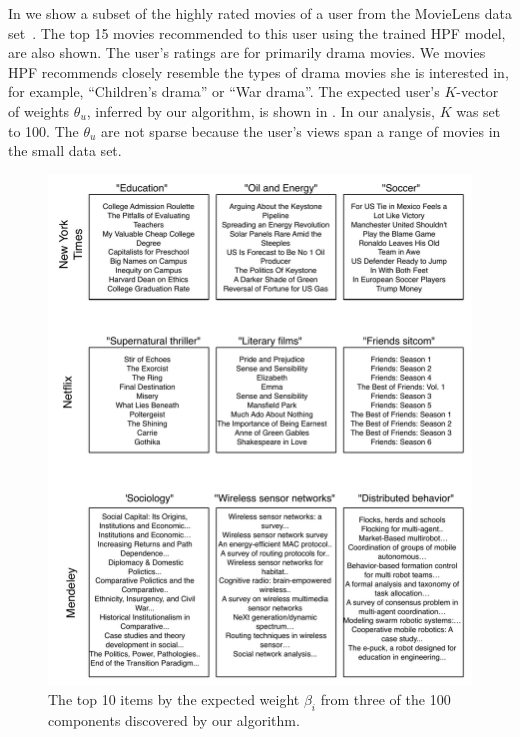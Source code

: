 In  we show a subset of the highly rated
movies of a user from the MovieLens data
set~\cite{Herlocker:1999}. The top 15 movies recommended to this user
using the trained HPF model, are also shown. The user's ratings are
for primarily drama movies. We movies HPF recommends closely resemble
the types of drama movies she is interested in, for example,
``Children's drama'' or ``War drama''. The expected user's $K$-vector
of weights $\theta_u$, inferred by our algorithm, is shown in
. In our analysis, $K$ was set to
100. The $\theta_u$ are not sparse because the user's views span a
range of movies in the small data set.

\begin{figure}
\centering
\includegraphics[width=\textwidth]{./figures/components.pdf}
\caption{The top 10 items by the expected weight $\beta_i$ from three
  of the 100 components discovered by our algorithm.}
\label{fig:components}
\end{figure}
